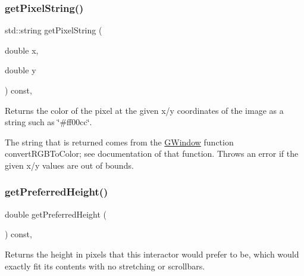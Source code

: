 \subsubsection{\texorpdfstring{get\+Pixel\+String()}{getPixelString()}}
{\footnotesize\ttfamily std\+::string get\+Pixel\+String (\begin{DoxyParamCaption}\item[{double}]{x,  }\item[{double}]{y }\end{DoxyParamCaption}) const\hspace{0.3cm}{\ttfamily [virtual]}, {\ttfamily [inherited]}}



Returns the color of the pixel at the given x/y coordinates of the image as a string such as \char`\"{}\#ff00cc\char`\"{}. 

The string that is returned comes from the {\ttfamily \mbox{\hyperlink{classsgl_1_1GWindow}{G\+Window}}} function {\ttfamily convert\+R\+G\+B\+To\+Color}; see documentation of that function. Throws an error if the given x/y values are out of bounds. \mbox{\label{classsgl_1_1GInteractor_a747de0961653847bdc6615dbf756d715}} 
\subsubsection{\texorpdfstring{get\+Preferred\+Height()}{getPreferredHeight()}}
{\footnotesize\ttfamily double get\+Preferred\+Height (\begin{DoxyParamCaption}{ }\end{DoxyParamCaption}) const\hspace{0.3cm}{\ttfamily [virtual]}, {\ttfamily [inherited]}}



Returns the height in pixels that this interactor would prefer to be, which would exactly fit its contents with no stretching or scrollbars. 

\mbox{\label{classsgl_1_1GInteractor_a4aabbee761d8e9116275401131b7ccd1}} 
